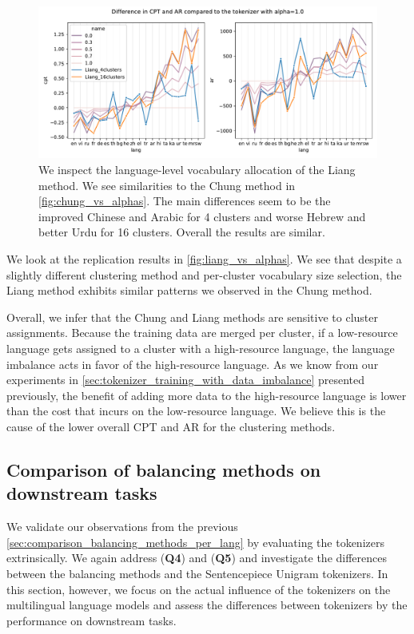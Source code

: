 \begin{figure}
    \centering
    \includegraphics[width=\textwidth]{figures/liang_vs_alphas.pdf}
    \caption{We inspect the language-level vocabulary allocation of the Liang method. We see similarities to the Chung method in \autoref{fig:chung_vs_alphas}. The main differences seem to be the improved Chinese and Arabic for 4 clusters and worse Hebrew and better Urdu for 16 clusters. Overall the results are similar.}
    \label{fig:liang_vs_alphas}
\end{figure}

We look at the \citet{liang_xlm-v_2023} replication results in \autoref{fig:liang_vs_alphas}. We see that despite a slightly different clustering method and per-cluster vocabulary size selection, the Liang method exhibits similar patterns we observed in the Chung method.

Overall, we infer that the Chung and Liang methods are sensitive to cluster assignments. Because the training data are merged per cluster, if a low-resource language gets assigned to a cluster with a high-resource language, the language imbalance acts in favor of the high-resource language. As we know from our experiments in \autoref{sec:tokenizer_training_with_data_imbalance} presented previously, the benefit of adding more data to the high-resource language is lower than the cost that incurs on the low-resource language. We believe this is the cause of the lower overall CPT and AR for the clustering methods.

\subsection{Comparison of balancing methods on downstream tasks}

We validate our observations from the previous \autoref{sec:comparison_balancing_methods_per_lang} by evaluating the tokenizers extrinsically. We again address (\textbf{Q4}) and (\textbf{Q5}) and investigate the differences between the balancing methods and the Sentencepiece Unigram tokenizers. In this section, however, we focus on the actual influence of the tokenizers on the multilingual language models and assess the differences between tokenizers by the performance on downstream tasks.

